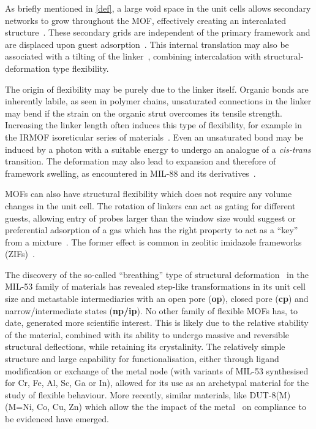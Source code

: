 As briefly mentioned in \autoref{def}, a large void 
space in the unit cells allows secondary networks 
to grow throughout the MOF, effectively creating an 
intercalated structure~\cite{kepertVersatileFamilyInterconvertible2000,%
kitauraPorousCoordinationPolymerCrystals2003}. 
These secondary grids are independent
of the primary framework and are displaced upon guest 
adsorption~\cite{majiFlexibleInterpenetratingCoordination2007}. 
This internal translation may also be associated 
with a tilting of the 
linker~\cite{sakataShapeMemoryNanoporesInduced2013},
combining intercalation with structural-deformation type 
flexibility.

The origin of flexibility may be purely due to the linker 
itself. Organic bonds are inherently labile, as seen in 
polymer chains, unsaturated connections in the linker may
bend if the strain on the organic strut overcomes its tensile 
strength. Increasing the linker length often induces this 
type of flexibility, for example in the IRMOF isoreticular series
of materials~\cite{nelsonSupercriticalProcessingRoute2009}.
Even an unsaturated bond may be induced by a photon with a 
suitable energy to undergo an analogue of a \textit{cis-trans}
transition. The deformation may also lead to expansion and 
therefore of framework swelling,
as encountered in MIL-88 and its
derivatives~\cite{maIronBasedMetalOrganic2013}.

MOFs can also have structural flexibility which does not
require any volume changes in the unit cell. The rotation of linkers
can act as gating for different guests, allowing entry of probes
larger than the window size would suggest or preferential adsorption
of a gas which has the right property to act as a ``key'' from 
a mixture~\cite{seoPillaredLayerCoordinationPolymer2009}. 
The former effect is common in zeolitic imidazole frameworks 
(ZIFs)~\cite{fairen-jimenezOpeningGateFramework2011}.

The discovery of the so-called ``breathing'' type of structural
deformation~\cite{loiseauRationaleLargeBreathing2004, %
bourrellyDifferentAdsorptionBehaviors2005, %
    serreExplanationVeryLarge2007} in the MIL-53 family of
materials has revealed step-like transformations in its unit cell
size and metastable intermediaries with an open pore (\textbf{op}), 
closed pore (\textbf{cp}) and narrow/intermediate states (\textbf{np/ip}).
No other family of flexible MOFs has, to date, generated
more scientific interest. This is likely due to the relative 
stability of the material, combined with its ability to undergo massive 
and reversible structural deflections, while retaining its 
crystalinity. The relatively simple structure and large capability 
for functionalisation, either through ligand modification or exchange
of the metal node (with variants of MIL-53 synthesised for Cr, Fe, Al,
Sc, Ga or In), allowed for its use as an archetypal material 
for the study of flexible behaviour. More recently, similar 
materials, like DUT-8(M) (M=Ni, Co, Cu, Zn) which allow the the 
impact of the 
metal~\cite{kleinStructuralFlexibilityIntrinsic2012} on
compliance to be evidenced have emerged.

